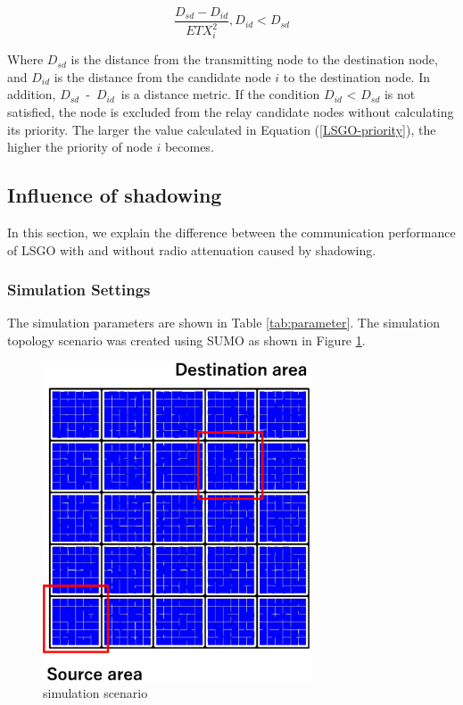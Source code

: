 \documentclass[conference]{IEEEtran}
\begin{document}
\begin{equation}
\label{LSGO-priority}
\frac{D_{sd} - D_{id}}{ETX_{i}^{2}} ,   D_{id} < D_{sd}
\end{equation}

Where $D_{sd}$ is the distance from the transmitting node to the destination node, and $D_{id}$ is the distance from the candidate node $i$ to the destination node. In addition, \mbox{$D_{sd}$ - $D_{id}$ }is a distance metric. If the condition $D_{id}$ < $D_{sd}$ is not satisfied, the node is excluded from the relay candidate nodes without calculating its priority. The larger the value calculated in Equation (\ref{LSGO-priority}), the higher the priority of node $i$ becomes. 

\subsection{Influence of shadowing}
\label{shadowing_evaluation}
In this section, we explain the difference between the communication performance of LSGO with and without radio attenuation caused by shadowing. 


\subsubsection{Simulation Settings} 
The simulation parameters are shown in Table \ref{tab:parameter}. 
The simulation topology scenario was created using SUMO\cite{27} as shown in Figure \ref{fig:scenario}. 

\begin{figure}[!ht]
\centering
\includegraphics[width=80mm]{figures/scenario.eps}
\caption{simulation scenario }
\label{fig:scenario}
\end{figure}
\end{document}

